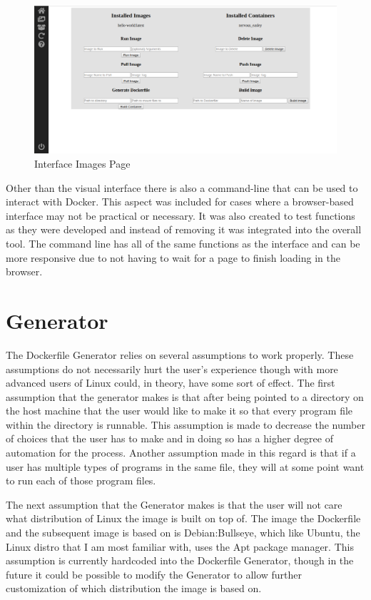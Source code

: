 \begin{figure}[h!]
  \centering
  \includegraphics[width=5in]{images/InterfaceImages}
  \caption{Interface Images Page}
  \label{img:ImagesPage}
\end{figure}

Other than the visual interface there is also a command-line that can be used to interact with Docker. This aspect was included for cases where a browser-based interface may not be practical or necessary. It was also created to test functions as they were developed and instead of removing it was integrated into the overall tool. The command line has all of the same functions as the interface and can be more responsive due to not having to wait for a page to finish loading in the browser.


\section{Generator}
\label{sec:generator}

The Dockerfile Generator relies on several assumptions to work properly. These assumptions do not necessarily hurt the user's experience though with more advanced users of Linux could, in theory, have some sort of effect. The first assumption that the generator makes is that after being pointed to a directory on the host machine that the user would like to make it so that every program file within the directory is runnable. This assumption is made to decrease the number of choices that the user has to make and in doing so has a higher degree of automation for the process. Another assumption made in this regard is that if a user has multiple types of programs in the same file, they will at some point want to run each of those program files.

The next assumption that the Generator makes is that the user will not care what distribution of Linux the image is built on top of. The image the Dockerfile and the subsequent image is based on is Debian:Bullseye, which like Ubuntu, the Linux distro that I am most familiar with, uses the Apt package manager. This assumption is currently hardcoded into the Dockerfile Generator, though in the future it could be possible to modify the Generator to allow further customization of which distribution the image is based on.


